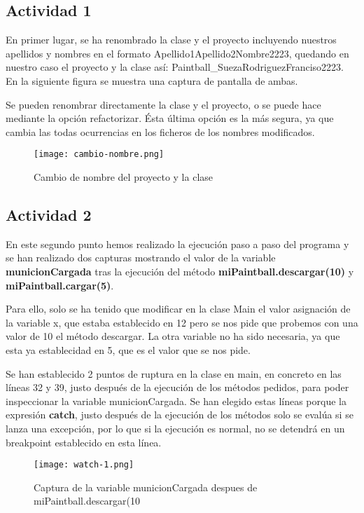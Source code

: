 \subsection{Actividad 1}

En primer lugar, se ha renombrado la clase y el proyecto incluyendo nuestros apellidos y nombres en el formato Apellido1Apellido2Nombre2223, quedando en nuestro caso el proyecto y la clase así: Paintball\_SuezaRodriguezFranciso2223. En la siguiente figura se muestra una captura de pantalla de ambas.

Se pueden renombrar directamente la clase y el proyecto, o se puede hace mediante la opción refactorizar. Ésta última opción es la más segura, ya que cambia las todas ocurrencias en los ficheros de los nombres modificados.

\begin{figure}[H]
    \centering
    \texttt{[image: cambio-nombre.png]}
    \caption{Cambio de nombre del proyecto y la clase}
\end{figure}


\subsection{Actividad 2}

En este segundo punto hemos realizado la ejecución paso a paso del programa y se han realizado dos capturas mostrando el valor de la variable \textbf{municionCargada} tras la ejecución del método \textbf{miPaintball.descargar(10)} y \textbf{miPaintball.cargar(5)}.

Para ello, solo se ha tenido que modificar en la clase Main el valor asignación de la variable x, que estaba establecido en 12 pero se nos pide que probemos con una valor de 10 el método descargar. La otra variable no ha sido necesaria, ya que esta ya establecidad en 5, que es el valor que se nos pide.

Se han establecido 2 puntos de ruptura en la clase en main, en concreto en las líneas 32 y 39, justo después de la ejecución de los métodos pedidos, para poder inspeccionar la variable municionCargada. Se han elegido estas líneas porque la expresión \textbf{catch}, justo después de la ejecución de los métodos solo se evalúa si se lanza una excepción, por lo que si la ejecución es normal, no se detendrá en un breakpoint establecido en esta línea.

\begin{figure}[ht]
    \centering
    \texttt{[image: watch-1.png]}
    \caption{Captura de la variable municionCargada despues de miPaintball.descargar(10}
\end{figure}

